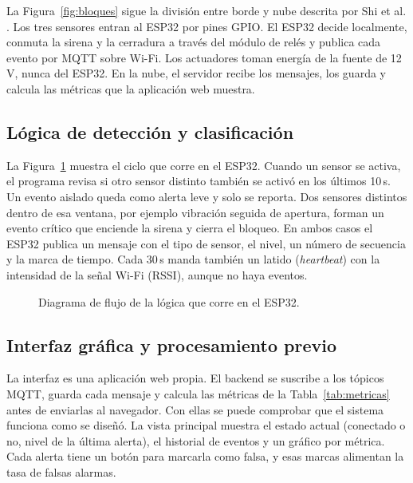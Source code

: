 \documentclass[conference]{IEEEtran}
\begin{document}
La Figura~\ref{fig:bloques} sigue la división entre borde y nube descrita por Shi et al. \cite{shi2016edge}. Los tres sensores entran al ESP32 por pines GPIO. El ESP32 decide localmente, conmuta la sirena y la cerradura a través del módulo de relés y publica cada evento por MQTT sobre Wi-Fi. Los actuadores toman energía de la fuente de 12\,V, nunca del ESP32. En la nube, el servidor recibe los mensajes, los guarda y calcula las métricas que la aplicación web muestra.

\subsection{Lógica de detección y clasificación}

La Figura~\ref{fig:flujo} muestra el ciclo que corre en el ESP32. Cuando un sensor se activa, el programa revisa si otro sensor distinto también se activó en los últimos 10\,s. Un evento aislado queda como alerta leve y solo se reporta. Dos sensores distintos dentro de esa ventana, por ejemplo vibración seguida de apertura, forman un evento crítico que enciende la sirena y cierra el bloqueo. En ambos casos el ESP32 publica un mensaje con el tipo de sensor, el nivel, un número de secuencia y la marca de tiempo. Cada 30\,s manda también un latido (\emph{heartbeat}) con la intensidad de la señal Wi-Fi (RSSI), aunque no haya eventos.

\begin{figure}[!t]
\centering

\caption{Diagrama de flujo de la lógica que corre en el ESP32.}
\label{fig:flujo}
\end{figure}

\subsection{Interfaz gráfica y procesamiento previo}

La interfaz es una aplicación web propia. El backend se suscribe a los tópicos MQTT, guarda cada mensaje y calcula las métricas de la Tabla~\ref{tab:metricas} antes de enviarlas al navegador. Con ellas se puede comprobar que el sistema funciona como se diseñó. La vista principal muestra el estado actual (conectado o no, nivel de la última alerta), el historial de eventos y un gráfico por métrica. Cada alerta tiene un botón para marcarla como falsa, y esas marcas alimentan la tasa de falsas alarmas.
\end{document}
